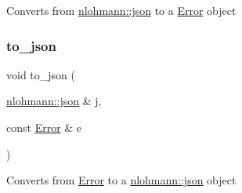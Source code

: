 Converts from {\ttfamily \hyperlink{namespacenlohmann_a2bfd99e845a2e5cd90aeaf1b1431f474}{nlohmann\+::json}} to a {\ttfamily \hyperlink{classshaan97_1_1sync_1_1_error}{Error}} object \mbox{\label{group___serialization_ga06e5a619d8d673a3bb00b006e62bbe1e}} 
\subsubsection{\texorpdfstring{to\+\_\+json}{to\_json}}
{\footnotesize\ttfamily void to\+\_\+json (\begin{DoxyParamCaption}\item[{\hyperlink{namespacenlohmann_a2bfd99e845a2e5cd90aeaf1b1431f474}{nlohmann\+::json} \&}]{j,  }\item[{const \hyperlink{classshaan97_1_1sync_1_1_error}{Error} \&}]{e }\end{DoxyParamCaption})\hspace{0.3cm}{\ttfamily [friend]}}

Converts from {\ttfamily \hyperlink{classshaan97_1_1sync_1_1_error}{Error}} to a {\ttfamily \hyperlink{namespacenlohmann_a2bfd99e845a2e5cd90aeaf1b1431f474}{nlohmann\+::json}} object 